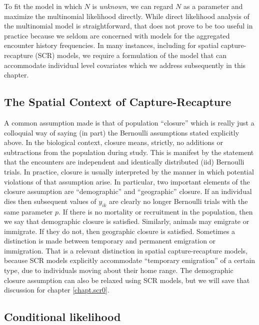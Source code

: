 To fit the model in which $N$ is {\it unknown}, we can regard $N$ as a
parameter and maximize the multinomial likelihood directly.  While
direct likelihood analysis of the multinomial model is
straightforward, that does not prove to be too useful in practice
because we seldom are concerned with models for the aggregated
encounter history frequencies. In many instances, including for
spatial capture-recapture (SCR) models, we require a formulation of
the model that can accommodate individual level covariates which we
address subsequently in this chapter.



\subsection{The Spatial Context of Capture-Recapture}

A common assumption made is that of population ``closure'' which is
really just a colloquial way of saying (in part) the Bernoulli
assumptions stated explicitly above. In the biological context,
closure means, strictly, no additions or subtractions from the
population during study. This is manifest by the statement that the
encounters are independent and identically distributed (iid) Bernoulli
trials.  In practice, closure is usually interpreted by the manner in
which potential violations of that assumption arise. In particular,
two important elements of the closure assumption are ``demographic''
and ``geographic'' closure. If an individual dies then subsequent
values of $y_{ik}$ are clearly no longer Bernoulli trials with the
same parameter $p$. If there is no mortality or recruitment in the
population, then we say that demographic closure is
satisfied. Similarly, animals may emigrate or immigrate. If they do
not, then geographic closure is satisfied. Sometimes a distinction is
made between temporary and permanent emigration or immigration. That
is a relevant distinction in spatial capture-recapture models, because
SCR models explicitly accommodate ``temporary emigration'' of a
certain type, due to individuals moving about their home range. The
demographic closure assumption can also be relaxed using SCR models,
but we will save that discussion for chapter \ref{chapt.scr0}.


\subsection{Conditional likelihood}

